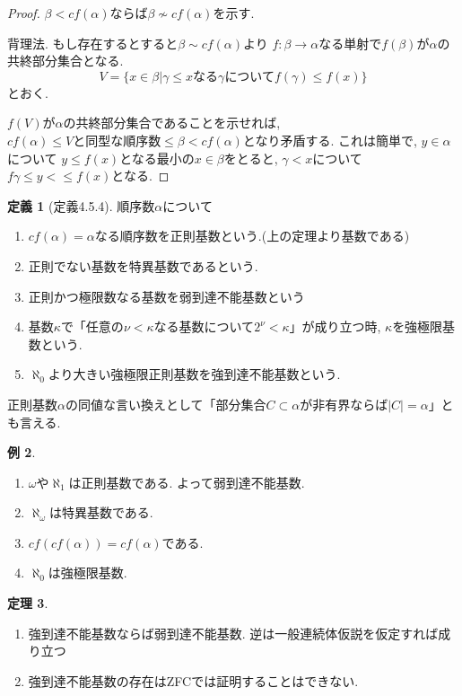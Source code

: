 \documentclass[dvipdfmx,a4paper,11pt]{report}
\theoremstyle{definition}
\newtheorem{thm}{定理}
\newtheorem{dfn}[thm]{定義}
\newtheorem{exa}[thm]{例}
\begin{document}
\begin{proof}
$\beta < cf(\alpha)$ならば$\beta \not \sim cf(\alpha)$を示す.

背理法. もし存在するとすると$\beta \sim cf(\alpha)$より
$f : \beta \to \alpha$なる単射で$f(\beta)$が$\alpha$の共終部分集合となる. 
$$
V= \{ x \in \beta| \gamma \le x \text{なる$\gamma$について} f(\gamma) \le f(x)\}
$$
とおく. 

$f(V)$が$\alpha$の共終部分集合であることを示せれば, $cf(\alpha) \le \text{$V$と同型な順序数} \le \beta < cf(\alpha)$となり矛盾する.
これは簡単で, $y \in \alpha$について
$y \le f(x)$となる最小の$x \in \beta$をとると, $\gamma < x $について
$f\gamma \le y < \le f(x) $となる. 
\end{proof}

 \begin{tcolorbox}
 [colback = white, colframe = green!35!black, fonttitle = \bfseries,breakable = true]
\begin{dfn}[定義4.5.4]
順序数$\alpha$について
\begin{enumerate}
\item $cf(\alpha) = \alpha$なる順序数を正則基数という.(上の定理より基数である)
\item 正則でない基数を特異基数であるという. 
\item 正則かつ極限数なる基数を弱到達不能基数という
\item 基数$\kappa$で「任意の$\nu < \kappa$なる基数について$2^{\nu}<\kappa$」が成り立つ時, $\kappa$を強極限基数という. 
\item $\aleph_0$より大きい強極限正則基数を強到達不能基数という. 
\end{enumerate}
\end{dfn}
\end{tcolorbox}

正則基数$\alpha$の同値な言い換えとして「部分集合$C \subset \alpha$が非有界ならば$|C| = \alpha$」とも言える.

\begin{exa}
\begin{enumerate}
\item $\omega$や$\aleph_1$は正則基数である. よって弱到達不能基数.
\item $\aleph_{\omega}$は特異基数である. 
\item $cf(cf(\alpha))= cf(\alpha)$である. 
\item $\aleph_0$は強極限基数. 
\end{enumerate}
\end{exa}

\begin{thm}
\begin{enumerate}
\item 強到達不能基数ならば弱到達不能基数. 逆は一般連続体仮説を仮定すれば成り立つ
\item 強到達不能基数の存在はZFCでは証明することはできない. 
\end{enumerate}
\end{thm}
\end{document}
